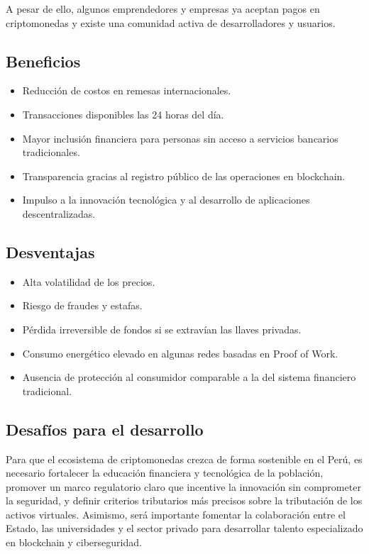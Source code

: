 \documentclass[12pt,a4paper]{article}
\begin{document}
A pesar de ello, algunos emprendedores y empresas ya aceptan pagos en criptomonedas y existe una comunidad activa de desarrolladores y usuarios.

\subsection*{Beneficios}

\begin{itemize}
  \item Reducción de costos en remesas internacionales.
  \item Transacciones disponibles las 24 horas del día.
  \item Mayor inclusión financiera para personas sin acceso a servicios bancarios tradicionales.
  \item Transparencia gracias al registro público de las operaciones en blockchain.
  \item Impulso a la innovación tecnológica y al desarrollo de aplicaciones descentralizadas.
\end{itemize}

\subsection*{Desventajas}

\begin{itemize}
  \item Alta volatilidad de los precios.
  \item Riesgo de fraudes y estafas.
  \item Pérdida irreversible de fondos si se extravían las llaves privadas.
  \item Consumo energético elevado en algunas redes basadas en Proof of Work.
  \item Ausencia de protección al consumidor comparable a la del sistema financiero tradicional.
\end{itemize}

\subsection*{Desafíos para el desarrollo}

Para que el ecosistema de criptomonedas crezca de forma sostenible en el Perú, es necesario fortalecer la educación financiera y tecnológica de la población, promover un marco regulatorio claro que incentive la innovación sin comprometer la seguridad, y definir criterios tributarios más precisos sobre la tributación de los activos virtuales. Asimismo, será importante fomentar la colaboración entre el Estado, las universidades y el sector privado para desarrollar talento especializado en blockchain y ciberseguridad.
\end{document}
